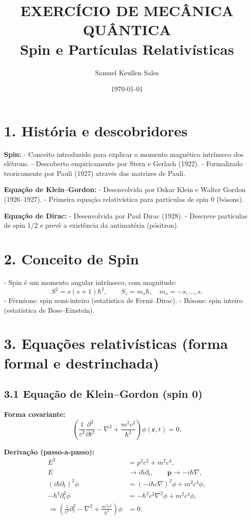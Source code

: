 \documentclass[12pt,a4paper]{article}
\title{EXERCÍCIO DE MECÂNICA QUÂNTICA \\ Spin e Partículas Relativísticas}
\author{Samuel Keullen Sales}
\date{\today}
\begin{document}
\maketitle

\section*{1. História e descobridores}

\textbf{Spin:}  
- Conceito introduzido para explicar o momento magnético intrínseco dos elétrons.  
- Descoberto empiricamente por Stern e Gerlach (1922).  
- Formalizado teoricamente por Pauli (1927) através das matrizes de Pauli.

\textbf{Equação de Klein--Gordon:}  
- Desenvolvida por Oskar Klein e Walter Gordon (1926--1927).  
- Primeira equação relativística para partículas de spin 0 (bósons).

\textbf{Equação de Dirac:}  
- Desenvolvida por Paul Dirac (1928).  
- Descreve partículas de spin \(1/2\) e prevê a existência da antimatéria (pósitron).

\section*{2. Conceito de Spin}

- Spin é um momento angular intrínseco, com magnitude:
\[
S^2 = s(s+1)\hbar^2,
\qquad S_z = m_s \hbar,\quad m_s=-s,\dots,s.
\]
- Férmions: spin semi-inteiro (estatística de Fermi--Dirac).  
- Bósons: spin inteiro (estatística de Bose--Einstein).

\section*{3. Equações relativísticas (forma formal e destrinchada)}

\subsection*{3.1 Equação de Klein--Gordon (spin 0)}

\textbf{Forma covariante:}
\[
\left(\frac{1}{c^2}\frac{\partial^2}{\partial t^2} - \nabla^2 + \frac{m^2 c^2}{\hbar^2}\right)\phi(\mathbf{r},t) = 0.
\]

\textbf{Derivação (passo-a-passo):}
\begin{align*}
E^2 &= p^2 c^2 + m^2 c^4, \\
E &\to i\hbar\partial_t, \qquad \mathbf{p}\to -i\hbar\nabla, \\
(i\hbar\partial_t)^2 \phi &= (-i\hbar c \nabla)^2 \phi + m^2 c^4 \phi, \\
-\hbar^2 \partial_t^2 \phi &= -\hbar^2 c^2 \nabla^2 \phi + m^2 c^4 \phi, \\
\Rightarrow \left(\frac{1}{c^2}\partial_t^2 - \nabla^2 + \frac{m^2 c^2}{\hbar^2}\right)\phi &= 0.
\end{align*}
\end{document}
